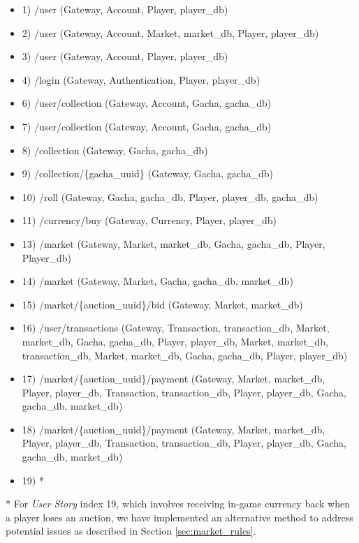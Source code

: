 \documentclass{article}
\begin{document}
\begin{itemize}
    \item 1) /user (Gateway, Account, Player, player\_db)
    \item 2) /user (Gateway, Account, Market, market\_db, Player, player\_db)
    \item 3) /user (Gateway, Account, Player, player\_db)
    \item 4) /login (Gateway, Authentication, Player, player\_db)
    \item 6) /user/collection (Gateway, Account, Gacha, gacha\_db)
    \item 7) /user/collection (Gateway, Account, Gacha, gacha\_db)
    \item 8) /collection (Gateway, Gacha, gacha\_db)
    \item 9) /collection/\{gacha\_uuid\} (Gateway, Gacha, gacha\_db)
    \item 10) /roll (Gateway, Gacha, gacha\_db, Player, player\_db, gacha\_db)
    \item 11) /currency/buy (Gateway, Currency, Player, player\_db)
    \item 13) /market (Gateway, Market, market\_db, Gacha, gacha\_db, Player, Player\_db)
    \item 14) /market (Gateway, Market, Gacha, gacha\_db, market\_db)
    \item 15) /market/\{auction\_uuid\}/bid (Gateway, Market, market\_db)
    \item 16) /user/transactions (Gateway, Transaction, transaction\_db, Market, market\_db, Gacha, gacha\_db, Player, player\_db, Market, market\_db, transaction\_db, Market, market\_db, Gacha, gacha\_db, Player, player\_db)
    \item 17) /market/\{auction\_uuid\}/payment (Gateway, Market, market\_db, Player, player\_db, Transaction, transaction\_db, Player, player\_db, Gacha, gacha\_db, market\_db)
    \item 18) /market/\{auction\_uuid\}/payment (Gateway, Market, market\_db, Player, player\_db, Transaction, transaction\_db, Player, player\_db, Gacha, gacha\_db, market\_db)
    \item 19) *
\end{itemize}

* For \emph{User Story} index 19, which involves receiving in-game currency back when a player loses an auction, we have implemented an alternative method to address potential issues as described in Section \ref{sec:market_rules}.

\newpage
\end{document}
